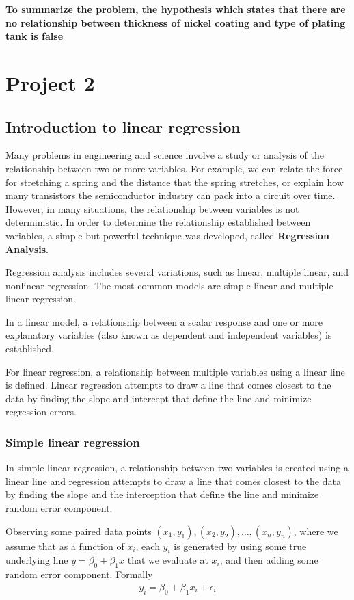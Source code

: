 \documentclass[a4paper]{article}
\numberwithin{equation}{section}
\begin{document}
\textbf{To summarize the problem, the hypothesis which states that there are no relationship between thickness of nickel coating and type of plating tank is false}

\newpage
\section{Project 2}
\subsection{Introduction to linear regression}
Many problems in engineering and science involve a study or analysis of the relationship between two or more variables.
For example, we can relate the force for stretching a spring and the distance that the spring stretches, or explain how many transistors the semiconductor industry can pack into a circuit over time.
However, in many situations, the relationship between variables is not deterministic. In order to determine the relationship established between variables, a simple but powerful technique was developed, called \textbf{Regression Analysis}.

Regression analysis includes several variations, such as linear, multiple linear, and nonlinear regression. The most common models are simple linear and multiple linear regression.

In a linear model, a relationship between a scalar response and one or more explanatory variables (also known as dependent and independent variables) is established.

For linear regression, a relationship between multiple variables using a linear line is defined. Linear regression attempts to draw a line that comes closest to the data by finding the slope and intercept that define the line and minimize regression errors.

\subsubsection{Simple linear regression}\label{simpleLRDef}
In simple linear regression, a relationship between two variables is created using a linear line and regression attempts to draw a line that comes closest to the data by finding the slope and the interception that define the line and minimize random error component.

Observing some paired data points \((x_1, y_1), (x_2, y_2), \dots, (x_n, y_n)\), where we assume that as a function of \(x_i\), each \(y_i\) is generated by using some true underlying line \(y = \beta_0 + \beta_1x\) that we evaluate at \(x_i\), and then adding some random error component.
Formally
\begin{align*}
  y_i = \beta_0 + \beta_1x_i + \epsilon_i
\end{align*}
\end{document}
